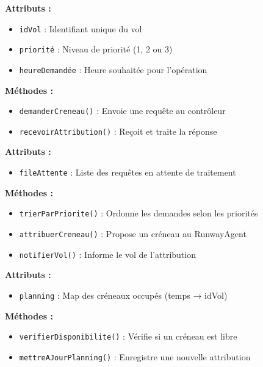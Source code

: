 \documentclass[12pt,a4paper]{article}
\begin{document}
\begin{description}[style=nextline, leftmargin=0pt]
    \item[\color{primaryblue}FlightAgent]
    \textbf{Attributs :}
    \begin{itemize}
        \item \texttt{idVol} : Identifiant unique du vol
        \item \texttt{priorité} : Niveau de priorité (1, 2 ou 3)
        \item \texttt{heureDemandée} : Heure souhaitée pour l'opération
    \end{itemize}
    \textbf{Méthodes :}
    \begin{itemize}
        \item \texttt{demanderCreneau()} : Envoie une requête au contrôleur
        \item \texttt{recevoirAttribution()} : Reçoit et traite la réponse
    \end{itemize}

    \item[\color{primaryblue}ControllerAgent]
    \textbf{Attributs :}
    \begin{itemize}
        \item \texttt{fileAttente} : Liste des requêtes en attente de traitement
    \end{itemize}
    \textbf{Méthodes :}
    \begin{itemize}
        \item \texttt{trierParPriorite()} : Ordonne les demandes selon les priorités
        \item \texttt{attribuerCreneau()} : Propose un créneau au RunwayAgent
        \item \texttt{notifierVol()} : Informe le vol de l'attribution
    \end{itemize}

    \item[\color{primaryblue}RunwayAgent]
    \textbf{Attributs :}
    \begin{itemize}
        \item \texttt{planning} : Map des créneaux occupés (temps → idVol)
    \end{itemize}
    \textbf{Méthodes :}
    \begin{itemize}
        \item \texttt{verifierDisponibilite()} : Vérifie si un créneau est libre
        \item \texttt{mettreAJourPlanning()} : Enregistre une nouvelle attribution
    \end{itemize}
\end{description}
\end{document}
